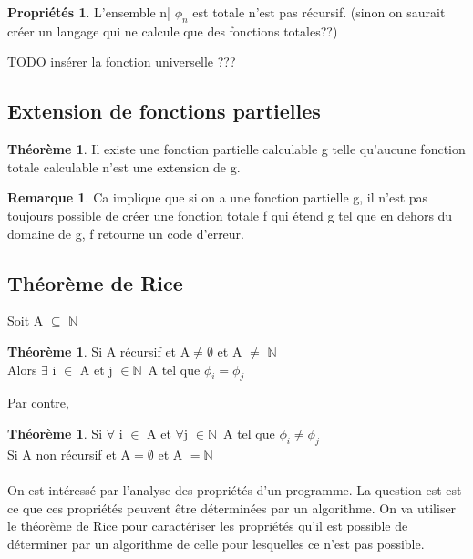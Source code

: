 \documentclass[11pt,a4paper]{article}
\newcommand{\N}{\mathbb{N}}
\theoremstyle{definition}
\newtheorem{myprop}[mydef]{Propriétés}
\newtheorem{myrem}[mydef]{Remarque}
\newtheorem{mytheo}[mydef]{Théorème}
\begin{document}
\begin{myprop}
	L'ensemble {n| $\phi_n$ est totale} n'est pas récursif. (sinon on 
	saurait créer un langage qui ne calcule que des fonctions totales??)
\end{myprop}

TODO insérer la fonction universelle ???


\subsection{Extension de fonctions partielles}
\label{sub:extension_de_fonctions_partielles}

\begin{mytheo}
	Il existe une fonction partielle calculable g telle 
	qu'aucune fonction totale calculable n'est une extension de g.
\end{mytheo}

\begin{myrem}
	Ca implique que si on a une fonction partielle g, il n'est pas 
	toujours possible de créer une fonction totale f qui étend g
	tel que en dehors du domaine de g, f retourne un code d'erreur.
\end{myrem}
	

\subsection{Théorème de Rice}
\label{sub:th_or_me_de_rice}

Soit A $\subseteq$ $\N$ \\

\begin{mytheo}
	Si A récursif et A$\neq \emptyset$ et A $\neq$ $\N$ \\
	Alors $\exists$ i $\in$ A et j $\in \N$\ A tel que $\phi _i = \phi _j$
\end{mytheo}

Par contre,

\begin{mytheo}
	Si $\forall$ i $\in$ A et $\forall$j $\in \N$\ A tel que $\phi_i \neq 
	\phi_j$ \\
	Si A non récursif et A$=\emptyset$ et A $= \N$
\end{mytheo}

\paragraph{} On est intéressé par l'analyse des propriétés d'un programme. La 
question est est-ce que ces propriétés peuvent être déterminées par un 
algorithme. On va utiliser le théorème de Rice pour caractériser les propriétés 
qu'il est possible de déterminer par un algorithme de celle pour lesquelles ce 
n'est pas possible.
\end{document}
